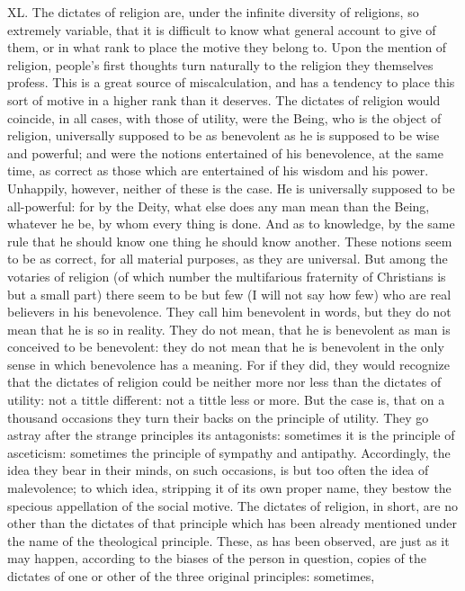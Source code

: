 \documentclass[12pt]{report}
\begin{document}
XL. The dictates of religion are, under the infinite diversity of
religions, so extremely variable, that it is difficult to know what
general account to give of them, or in what rank to place the motive
they belong to. Upon the mention of religion, people's first thoughts
turn naturally to the religion they themselves profess. This is a great
source of miscalculation, and has a tendency to place this sort of
motive in a higher rank than it deserves. The dictates of religion would
coincide, in all cases, with those of utility, were the Being, who is
the object of religion, universally supposed to be as benevolent as he
is supposed to be wise and powerful; and were the notions entertained of
his benevolence, at the same time, as correct as those which are
entertained of his wisdom and his power. Unhappily, however, neither of
these is the case. He is universally supposed to be all-powerful: for by
the Deity, what else does any man mean than the Being, whatever he be,
by whom every thing is done. And as to knowledge, by the same rule that
he should know one thing he should know another. These notions seem to
be as correct, for all material purposes, as they are universal. But
among the votaries of religion (of which number the multifarious
fraternity of Christians is but a small part) there seem to be but few
(I will not say how few) who are real believers in his benevolence. They
call him benevolent in words, but they do not mean that he is so in
reality. They do not mean, that he is benevolent as man is conceived to
be benevolent: they do not mean that he is benevolent in the only sense
in which benevolence has a meaning. For if they did, they would
recognize that the dictates of religion could be neither more nor less
than the dictates of utility: not a tittle different: not a tittle less
or more. But the case is, that on a thousand occasions they turn their
backs on the principle of utility. They go astray after the strange
principles its antagonists: sometimes it is the principle of asceticism:
sometimes the principle of sympathy and antipathy. Accordingly, the idea
they bear in their minds, on such occasions, is but too often the idea
of malevolence; to which idea, stripping it of its own proper name, they
bestow the specious appellation of the social motive. The dictates of
religion, in short, are no other than the dictates of that principle
which has been already mentioned under the name of the theological
principle. These, as has been observed, are just as it may happen,
according to the biases of the person in question, copies of the
dictates of one or other of the three original principles: sometimes,
\end{document}
